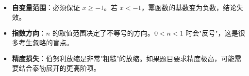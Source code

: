\begin{trapbox}
\begin{itemize}
    \item \textbf{自变量范围}：必须保证 $x \geqslant -1$。若 $x < -1$，幂函数的基数变为负数，结论失效。
    \item \textbf{指数方向}：$n$ 的取值范围决定了不等号的方向。$0 < n < 1$ 时会"反号"，这是很多考生忽略的盲点。
    \item \textbf{精度损失}：伯努利放缩是非常"粗糙"的放缩。如果题目要求精度极高，可能需要结合泰勒展开的更高阶项。
\end{itemize}
\end{trapbox}